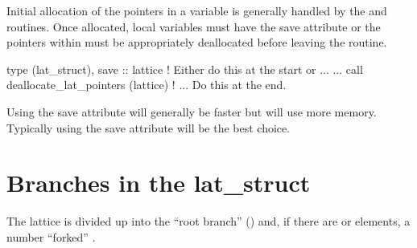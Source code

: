 { Initial allocation of the pointers in
a  variable is generally handled by the  and
 routines.  Once allocated, local  variables
must have the save attribute or the pointers within must be appropriately deallocated before leaving
the routine.
\begin{example}
  type (lat_struct), save :: lattice     ! Either do this at the start or ...
  ...
  call deallocate_lat_pointers (lattice) ! ... Do this at the end.
\end{example}
Using the save attribute will generally be faster but will use more
memory. Typically using the save attribute will be the best choice.

\section{Branches in the lat_struct}
\label {s:lat.struct}

The lattice is divided up into the ``root branch'' () and,
if there are  or  elements, a number ``forked''
.

}
